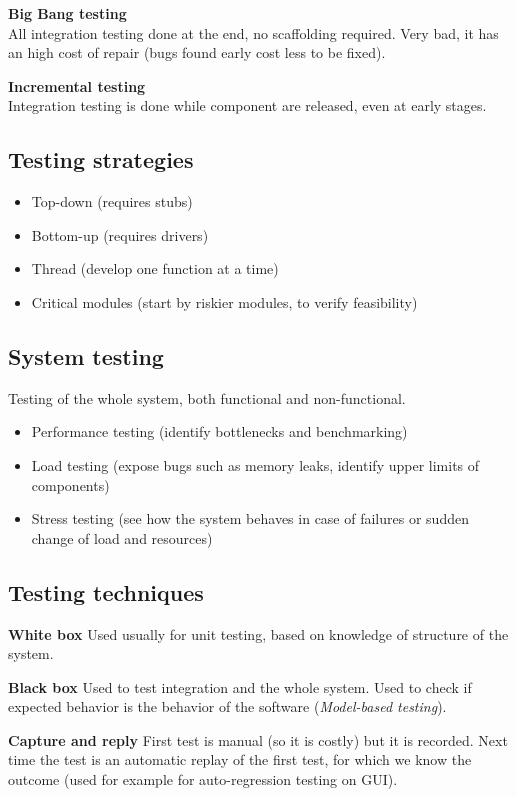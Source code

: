 \textbf{Big Bang testing}\\
All integration testing done at the end, no scaffolding required.
Very bad, it has an high cost of repair (bugs found early cost less to be fixed).

\textbf{Incremental testing}\\
Integration testing is done while component are released, even at early stages.

\subsection{Testing strategies}
\begin{itemize}
    \item Top-down (requires stubs)
    \item Bottom-up (requires drivers)
    \item Thread (develop one function at a time)
    \item Critical modules (start by riskier modules, to verify feasibility)
\end{itemize}

\subsection{System testing}
Testing of the whole system, both functional and non-functional.
\begin{itemize}
    \item Performance testing (identify bottlenecks and benchmarking)
    \item Load testing (expose bugs such as memory leaks, identify upper limits of components)
    \item Stress testing (see how the system behaves in case of failures or sudden change of load and resources)
\end{itemize}

\subsection{Testing techniques}
\textbf{White box} Used usually for unit testing, based on knowledge of structure of the system.

\textbf{Black box} Used to test integration and the whole system. Used to check if expected behavior is the behavior of the software (\emph{Model-based testing}).

\textbf{Capture and reply} First test is manual (so it is costly) but it is recorded. Next time the test is an automatic replay of the first test, for which we know the outcome (used for example for auto-regression testing on GUI).
